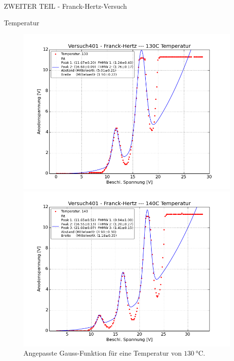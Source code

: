 \begin{appendix}
\begin{chapter}{ZWEITER TEIL - Franck-Hertz-Versuch}
\begin{section}{Temperatur}
      
      \newpage
      \begin{figure}[ht]
        \centering
        \begin{minipage}{0.48\textwidth}
          \centering
          \includegraphics[width=\textwidth]
              {Figures/Versuch401-Franck-Hertz-130CTemperatur_Beschl_Spannung_Anodenspannung.png}
          \caption{Angepasste Gauss-Funktion für eine Temperatur von 
              $\SI{130}{\celsius}$.}
          \label{fig:AnhangFHT130C}
        \end{minipage} \quad
        \begin{minipage}{0.48\textwidth}
          \centering
          \includegraphics[width=\textwidth]
              {Figures/Versuch401-Franck-Hertz-140CTemperatur_Beschl_Spannung_Anodenspannung.png}

\end{minipage}
\end{figure}
\end{section}
\end{chapter}
\end{appendix}
